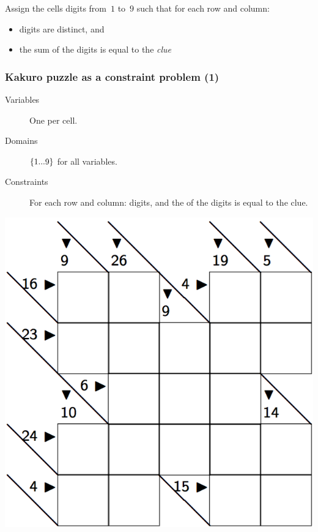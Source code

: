 \documentclass{beamer}
\newcommand{\stressed}[1]{\emph{{\color{red!50}{#1}}}}
\begin{document}
\begin{frame}
  \bigskip

  Assign the cells digits from~$1$ to~$9$ such that for each row and column:
  \begin{itemize}
    \item digits are distinct, and
    \item the sum of the digits is equal to the \emph{clue}
    \end{itemize}

\end{frame}

\begin{frame}
  \frametitle{Kakuro puzzle as a constraint problem (1)}
  \begin{minipage}{0.6\textwidth}
    \begin{description}
      \item[Variables] One per cell.
      \item[Domains] $\left\{1...9\right\}$ for all variables.
      \item[Constraints] For each row and column: \stressed{distinct} digits,
        and the \stressed{sum} of the digits is equal to the clue.
    \end{description} 
  \end{minipage}
  \begin{minipage}{0.35\textwidth}
    \includegraphics[scale=0.15]{kakuro.png}
  \end{minipage}
\end{frame}
\end{document}
